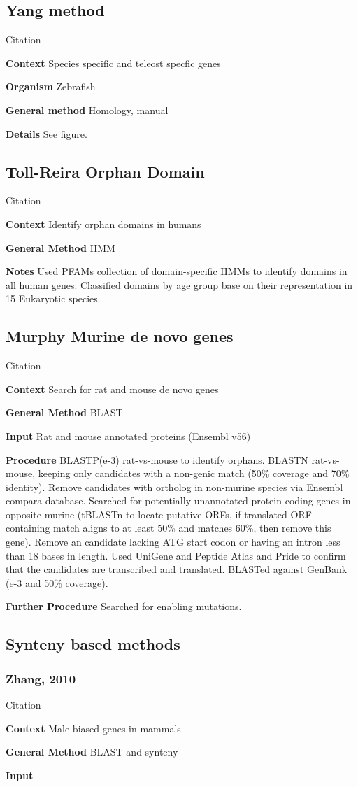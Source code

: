 \subsection{Yang method}

Citation \cite{yang_genome-wide_2013}

\textbf{Context} Species specific and teleost specfic genes

\textbf{Organism} Zebrafish

\textbf{General method} Homology, manual

\textbf{Details} See figure.


\subsection{Toll-Reira Orphan Domain}

Citation \cite{toll-riera_emergence_2013}

\textbf{Context} Identify orphan domains in humans

\textbf{General Method} HMM

\textbf{Notes} Used PFAMs collection of domain-specific HMMs to identify
domains in all human genes. Classified domains by age group base on their
representation in 15 Eukaryotic species.
\subsection{Murphy Murine de novo genes}

Citation \cite{murphy_novo_2012}

\textbf{Context} Search for rat and mouse de novo genes

\textbf{General Method} BLAST

\textbf{Input} Rat and mouse annotated proteins (Ensembl v56)

\textbf{Procedure} BLASTP(e-3) rat-vs-mouse to identify orphans. BLASTN
rat-vs-mouse, keeping only candidates with a non-genic match (50\% coverage
and 70\% identity). Remove candidates with ortholog in non-murine species
via Ensembl compara database. Searched for potentially unannotated
protein-coding genes in opposite murine (tBLASTn to locate putative ORFs,
if translated ORF containing match aligns to at least 50\% and matches
60\%, then remove this gene). Remove an candidate lacking ATG start codon
or having an intron less than 18 bases in length. Used UniGene and Peptide
Atlas and Pride to confirm that the candidates are transcribed and
translated. BLASTed against GenBank (e-3 and 50\% coverage).

\textbf{Further Procedure} Searched for enabling mutations.

\subsection{Synteny based methods}

\subsubsection{Zhang, 2010}

Citation \cite{zhang_chromosomal_2010}

\textbf{Context} Male-biased genes in mammals

\textbf{General Method} BLAST and synteny

\textbf{Input} 
